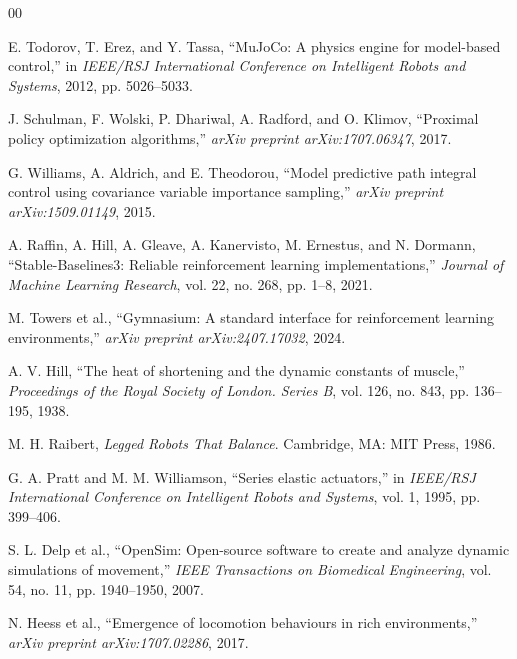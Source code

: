 \documentclass[conference]{IEEEtran}
\begin{document}
\begin{thebibliography}{00}

 E. Todorov, T. Erez, and Y. Tassa, ``MuJoCo: A physics engine for model-based control,'' in \textit{IEEE/RSJ International Conference on Intelligent Robots and Systems}, 2012, pp. 5026--5033.

 J. Schulman, F. Wolski, P. Dhariwal, A. Radford, and O. Klimov, ``Proximal policy optimization algorithms,'' \textit{arXiv preprint arXiv:1707.06347}, 2017.

 G. Williams, A. Aldrich, and E. Theodorou, ``Model predictive path integral control using covariance variable importance sampling,'' \textit{arXiv preprint arXiv:1509.01149}, 2015.

 A. Raffin, A. Hill, A. Gleave, A. Kanervisto, M. Ernestus, and N. Dormann, ``Stable-Baselines3: Reliable reinforcement learning implementations,'' \textit{Journal of Machine Learning Research}, vol. 22, no. 268, pp. 1--8, 2021.

 M. Towers et al., ``Gymnasium: A standard interface for reinforcement learning environments,'' \textit{arXiv preprint arXiv:2407.17032}, 2024.

 A. V. Hill, ``The heat of shortening and the dynamic constants of muscle,'' \textit{Proceedings of the Royal Society of London. Series B}, vol. 126, no. 843, pp. 136--195, 1938.

 M. H. Raibert, \textit{Legged Robots That Balance}. Cambridge, MA: MIT Press, 1986.

 G. A. Pratt and M. M. Williamson, ``Series elastic actuators,'' in \textit{IEEE/RSJ International Conference on Intelligent Robots and Systems}, vol. 1, 1995, pp. 399--406.

 S. L. Delp et al., ``OpenSim: Open-source software to create and analyze dynamic simulations of movement,'' \textit{IEEE Transactions on Biomedical Engineering}, vol. 54, no. 11, pp. 1940--1950, 2007.

 N. Heess et al., ``Emergence of locomotion behaviours in rich environments,'' \textit{arXiv preprint arXiv:1707.02286}, 2017.

\end{thebibliography}
\end{document}
